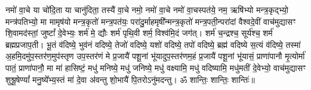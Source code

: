 नमो॑ वा॒चे या चो॑दि॒ता या चानु॑दिता॒ तस्यै॑ वा॒चे नमो॒ नमो॑ वा॒चे नमो॑ वा॒चस्पत॑ये॒ नम॒ ऋषि॑भ्यो मन्त्र॒कृद्भ्यो॒ मन्त्र॑पतिभ्यो॒ मा मामृष॑यो मन्त्र॒कृतो॑ मन्त्र॒पत॑यः॒ परा॑दु॒र्माहमृषी᳚न्मन्त्र॒कृतो॑ मन्त्र॒पती॒न्परा॑दां वैश्वदे॒वीं वाच॑मुद्यासꣳ शि॒वामद॑स्तां॒ जुष्टां᳚ दे॒वेभ्यः॒ शर्म॑ मे॒ द्यौः  शर्म॑ पृथि॒वी शर्म॒ विश्व॑मि॒दं जग॑त्। 
शर्म॑ च॒न्द्रश्च॒ सूर्य॑श्च॒ शर्म॑ ब्रह्मप्रजाप॒ती। 
भू॒तं व॑दिष्ये॒ भुव॑नं वदिष्ये॒ तेजो॑ वदिष्ये॒ यशो॑ वदिष्ये॒ तपो॑ वदिष्ये॒ ब्रह्म॑ वदिष्ये स॒त्यं व॑दिष्ये॒ तस्मा॑ अ॒हमि॒दमु॑प॒स्तर॑ण॒मुप॑स्तृण उप॒स्तर॑णं मे प्र॒जायै॑ पशू॒नां भू॑यादुप॒स्तर॑णम॒हं प्र॒जायै॑ पशू॒नां भू॑यासं॒ प्राणा॑पानौ मृ॒त्योर्मा॑ पातं॒ प्राणा॑पानौ॒ मा मा॑ हासिष्टं॒ मधु॑ मनिष्ये॒ मधु॑ जनिष्ये॒ मधु॑ वक्ष्यामि॒ मधु॑ वदिष्यामि॒ मधु॑मतीं दे॒वेभ्यो॒ वाच॑मुद्यासꣳ शुश्रू॒षेण्यां᳚ मनु॒ष्ये᳚भ्य॒स्तं मा॑ दे॒वा अ॑वन्तु शो॒भायै॑ पि॒तरोऽनु॑मदन्तु। 
ॐ शान्तिः॒ शान्तिः॒ शान्तिः॑॥ 

\closesection